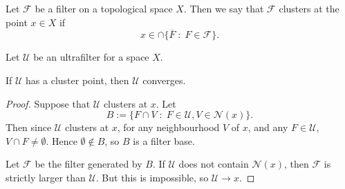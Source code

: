 \documentclass{owmaths}
\begin{document}
\begin{definition}
    Let $\mathcal{F}$ be a filter on a topological space $X$. Then we
    say that $\mathcal{F}$ clusters at the point $x \in X$ if
    \begin{equation*}
        x \in \cap\{ \overline{F}\;:\;F \in \mathcal{F}\}.
    \end{equation*}
\end{definition}

\begin{proposition}
\label{clusterImpliesConverge}
    Let $\mathcal{U}$ be an ultrafilter for a space $X$.
    
    If $\mathcal{U}$ has a cluster point, then $\mathcal{U}$
    converges.
\end{proposition}
\begin{proof}
    Suppose that $\mathcal{U}$
    clusters at $x$. Let
    \begin{equation*}
        B := \{ F\cap V\;:\;F \in\mathcal{U},V \in \mathcal{N}(x)\}.
    \end{equation*}
    Then since $\mathcal{U}$ clusters at $x$, for any neighbourhood $V$
    of $x$, and any $F \in \mathcal{U}$, $V \cap F \neq \emptyset$. Hence $\emptyset \notin B$,
    so $B$ is a filter base.
    
    Let $\mathcal{F}$ be the filter generated by $B$. If $\mathcal{U}$
    does not contain $\mathcal{N}(x)$, then $\mathcal{F}$ is strictly
    larger than $\mathcal{U}$. But this is impossible, 
    so $\mathcal{U}\rightarrow x$. 
\end{proof}
\end{document}
